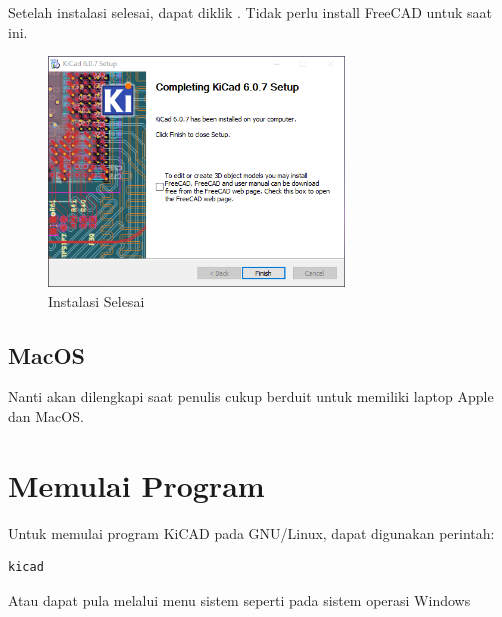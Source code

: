 \documentclass[12pt]{book}
\begin{document}
	Setelah instalasi selesai, dapat diklik .
	Tidak perlu install FreeCAD untuk saat ini.

	\begin{figure}[!ht]
		\centering
		\includegraphics[width=0.7\textwidth]{images/installations/kicad_install_3}
		\caption{Instalasi Selesai}
	\end{figure}

	\newpage
	\subsection{MacOS}
	Nanti akan dilengkapi saat penulis cukup berduit untuk memiliki laptop Apple dan MacOS.

	\section{Memulai Program}

	Untuk memulai program KiCAD pada GNU/Linux, dapat digunakan perintah:
	\begin{lstlisting}
kicad
	\end{lstlisting}

	Atau dapat pula melalui menu sistem seperti pada sistem operasi Windows
\end{document}
